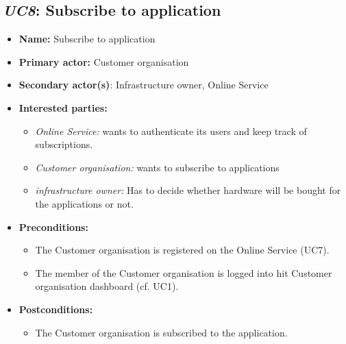 \documentclass[english]{sareport}
\begin{document}
\subsection{\emph{UC8}: Subscribe to application}
\begin{itemize}
    \item \textbf{Name:} Subscribe to application
    \item \textbf{Primary actor:} Customer organisation
    \item \textbf{Secondary actor(s)}: Infrastructure owner, Online Service
    \item \textbf{Interested parties:} 
        \begin{itemize}
            \item \textit{Online Service:} wants to authenticate its users and keep track of subscriptions.
            \item \textit{Customer organisation:} wants to subscribe to applications
            \item \textit{infrastructure owner:} Has to decide whether hardware will be bought for the applications or not.
        \end{itemize}

    \item \textbf{Preconditions:}
        \begin{itemize}
            \item The Customer organisation is registered on the Online Service (UC7).
            \item The member of the Customer organisation is logged into hit Customer organisation dashboard (cf. UC1).
        \end{itemize}

    \item \textbf{Postconditions:}
        \begin{itemize}
            \item The Customer organisation is subscribed to the application.

        \end{itemize}


\end{itemize}
\end{document}
